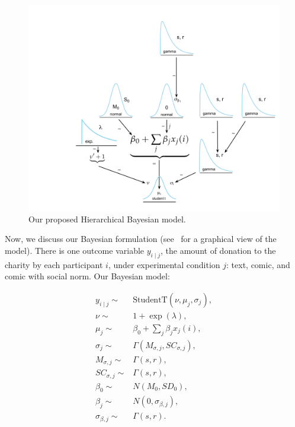 \begin{figure}[htb]
	\includegraphics[width=1\textwidth]{./figures/gen_model.pdf}
    \caption{Our proposed Hierarchical Bayesian model.}
	\label{fig:generative model}
\end{figure}



Now, we discuss our Bayesian formulation (see~ for a graphical view of the model). There is one outcome variable $y_{i \mid j}$, the amount of donation to the charity by each participant $i$, under experimental condition $j$: text, comic, and comic with social norm. Our Bayesian model:

\begin{align}
    y_{i \mid j} \sim &  \mathrm{StudentT}(\nu, \mu_j, \sigma_j), \label{eq:bayesian formulation}\\
    \nu \sim & 1 + \exp(\lambda), \\
    \mu_j \sim & \beta_0 + \sum_j \beta_j x_j(i), \label{eq:mean response}\\
    \sigma_j \sim & \Gamma(M_{\sigma, j}, SC_{\sigma, j}),\\
    M_{\sigma, j} \sim & \Gamma(s,r), \\
    SC_{\sigma, j} \sim & \Gamma(s,r), \\
    \beta_0 \sim & N(M_0, SD_0), \\
    \beta_j \sim & N (0, \sigma_{\beta, j}), \\
    \sigma_{\beta, j} \sim & \Gamma(s,r).
\end{align}

